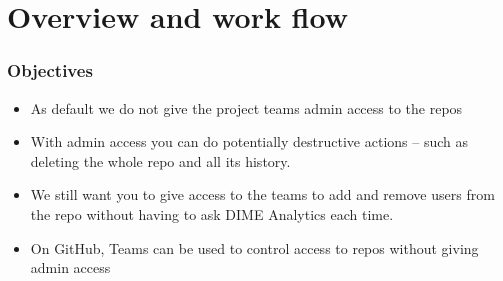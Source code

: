 \documentclass[aspectratio=169]{beamer} %
\begin{document}
\section{Overview and work flow}

\begin{frame}
	\frametitle{Objectives}
	
	\begin{itemize}
		\item As default we do not give the project teams admin access to the repos
		
		\item With admin access you can do potentially destructive actions -- such as deleting the whole repo and all its history. 
		
		\item We still want you to give access to the teams to add and remove users from the repo without having to ask DIME Analytics each time.
		
		\item On GitHub, Teams can be used to control access to repos without giving admin access

	\end{itemize}
\end{frame}
\end{document}
